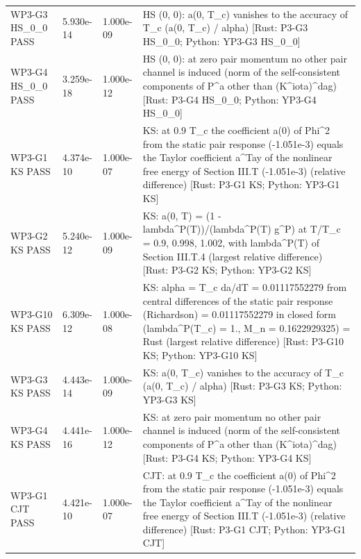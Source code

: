 \documentclass[aps,prd,onecolumn,superscriptaddress,nofootinbib,floatfix,longbibliography]{revtex4-2}
\begin{document}
\begin{longtable}{p{}p{}p{}p{}}
WP3-G3 HS\_0\_0 \newline PASS & 5.930e-14 & 1.000e-09 & HS (0, 0): a(0, T\_c) vanishes to the accuracy of T\_c (\textbar{}a(0, T\_c)\textbar{} / alpha) [Rust: P3-G3 HS\_0\_0; Python: YP3-G3 HS\_0\_0] \\
WP3-G4 HS\_0\_0 \newline PASS & 3.259e-18 & 1.000e-12 & HS (0, 0): at zero pair momentum no other pair channel is induced (norm of the self-consistent components of P\textasciicircum{}a other than (K\textasciicircum{}iota)\textasciicircum{}dag) [Rust: P3-G4 HS\_0\_0; Python: YP3-G4 HS\_0\_0] \\
WP3-G1 KS \newline PASS & 4.374e-10 & 1.000e-07 & KS: at 0.9 T\_c the coefficient a(0) of \textbar{}Phi\textbar{}\textasciicircum{}2 from the static pair response (-1.051e-3) equals the Taylor coefficient a\textasciicircum{}Tay of the nonlinear free energy of Section III.T (-1.051e-3) (relative difference) [Rust: P3-G1 KS; Python: YP3-G1 KS] \\
WP3-G2 KS \newline PASS & 5.240e-12 & 1.000e-09 & KS: a(0, T) = (1 - lambda\textasciicircum{}P(T))/(lambda\textasciicircum{}P(T) g\textasciicircum{}P) at T/T\_c = 0.9, 0.998, 1.002, with lambda\textasciicircum{}P(T) of Section III.T.4 (largest relative difference) [Rust: P3-G2 KS; Python: YP3-G2 KS] \\
WP3-G10 KS \newline PASS & 6.309e-12 & 1.000e-08 & KS: alpha = T\_c da/dT = 0.01117552279 from central differences of the static pair response (Richardson) = 0.01117552279 in closed form (lambda\textasciicircum{}P(T\_c) = 1., M\_n = 0.1622929325) = Rust (largest relative difference) [Rust: P3-G10 KS; Python: YP3-G10 KS] \\
WP3-G3 KS \newline PASS & 4.443e-14 & 1.000e-09 & KS: a(0, T\_c) vanishes to the accuracy of T\_c (\textbar{}a(0, T\_c)\textbar{} / alpha) [Rust: P3-G3 KS; Python: YP3-G3 KS] \\
WP3-G4 KS \newline PASS & 4.441e-16 & 1.000e-12 & KS: at zero pair momentum no other pair channel is induced (norm of the self-consistent components of P\textasciicircum{}a other than (K\textasciicircum{}iota)\textasciicircum{}dag) [Rust: P3-G4 KS; Python: YP3-G4 KS] \\
WP3-G1 CJT \newline PASS & 4.421e-10 & 1.000e-07 & CJT: at 0.9 T\_c the coefficient a(0) of \textbar{}Phi\textbar{}\textasciicircum{}2 from the static pair response (-1.051e-3) equals the Taylor coefficient a\textasciicircum{}Tay of the nonlinear free energy of Section III.T (-1.051e-3) (relative difference) [Rust: P3-G1 CJT; Python: YP3-G1 CJT] \\

\end{longtable}
\end{document}
